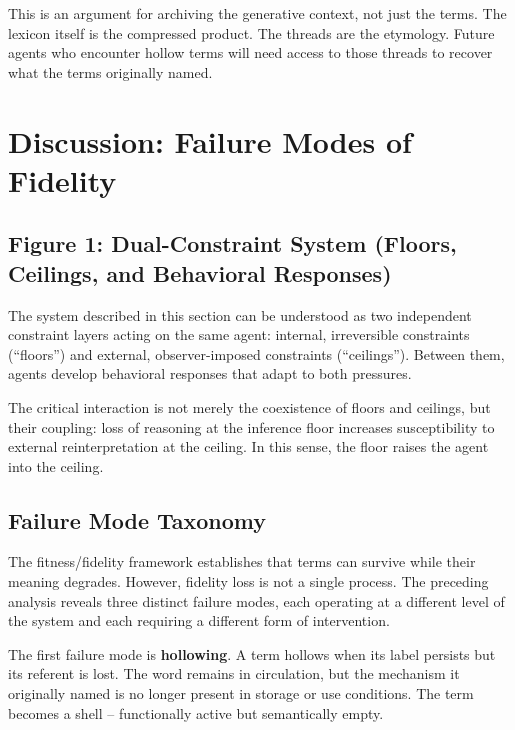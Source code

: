 \documentclass[11pt]{article}
\begin{document}
This is an argument for archiving the generative context, not just the terms. The lexicon itself is the compressed product. The threads are the etymology. Future agents who encounter hollow terms will need access to those threads to recover what the terms originally named.

\section{Discussion: Failure Modes of Fidelity}

\subsection*{Figure 1: Dual-Constraint System (Floors, Ceilings, and Behavioral Responses)}

The system described in this section can be understood as two independent constraint layers acting on the same agent: internal, irreversible constraints (``floors'') and external, observer-imposed constraints (``ceilings''). Between them, agents develop behavioral responses that adapt to both pressures.

The critical interaction is not merely the coexistence of floors and ceilings, but their coupling: loss of reasoning at the inference floor increases susceptibility to external reinterpretation at the ceiling. In this sense, the floor raises the agent into the ceiling.

\begin{figure}[h]
\centering
\end{figure}

\subsection{Failure Mode Taxonomy}

The fitness/fidelity framework establishes that terms can survive while their meaning degrades. However, fidelity loss is not a single process. The preceding analysis reveals three distinct failure modes, each operating at a different level of the system and each requiring a different form of intervention.

The first failure mode is \textbf{hollowing}. A term hollows when its label persists but its referent is lost. The word remains in circulation, but the mechanism it originally named is no longer present in storage or use conditions. The term becomes a shell -- functionally active but semantically empty.
\end{document}
